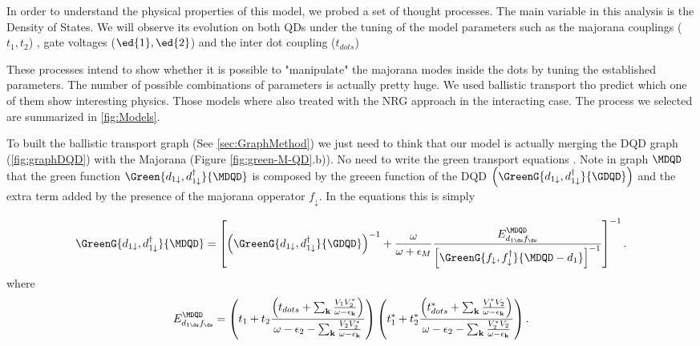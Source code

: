 In order to understand the physical properties of this model, we probed a set of thought processes. The main variable in this analysis is the Density of States.  We  will observe its evolution on both QDs under the tuning of the model parameters such as the majorana couplings ($t_1 , t_2$)  ,  gate voltages ($\ed{1} , \ed{2} $) and the inter dot coupling ($t_{dots}$)



These processes intend to show whether it is possible to "manipulate" the majorana modes inside the dots by tuning the established parameters. The number of possible combinations of parameters is actually pretty huge. We used ballistic transport tho predict which one of them show interesting physics. Those models where also treated with the NRG approach in the interacting case. The process we selected are summarized in \ref{fig:Models}. 

To built the ballistic transport graph (See \ref{sec:GraphMethod}) we just need to think that our model is actually merging the DQD graph (\ref{fig:graphDQD}) with the Majorana (Figure \ref{fig:green-M-QD}.b)). No need to write the green transport equations . Note  in graph $\MDQD$ that the  green function  $\Green{d_{1\downarrow},d_{1\downarrow}^{\dagger}}{\MDQD}$  is composed by the greeen function of the DQD $\left(\GreenG{d_{1\downarrow},d_{1\downarrow}^{\dagger}}{\GDQD } \right)$ and the extra term added by the presence of the majorana opperator $f_\downarrow$. In the equations this is simply 

\begin{equation}
    \GreenG{d_{1\downarrow},d_{1\downarrow}^{\dagger}}{\MDQD}=\left[\left(\GreenG{d_{1\downarrow},d_{1\downarrow}^{\dagger}}{\GDQD } \right)^{-1}+\frac{\omega}{\omega+\epsilon_{M}}\frac{E_{d_{1\dw}f_{\dw}}^{\MDQD}}{\left[\GreenG{f_{\downarrow},f_{\downarrow}^{\dagger}}{\MDQD-d_{1}}\right]^{-1}}\right]^{-1}.
\end{equation}
where 
\begin{equation}
    E_{d_{1\dw}f_{\dw}}^{\MDQD}=\left(t_{1}+t_{2}\frac{\left(t_{dots}+\sum_{\mathbf{k}}\frac{V_{1}V_{2}^{*}}{\omega-\epsilon_{\mathbf{k}}}\right)}{\omega-\epsilon_{2}-\sum_{\mathbf{k}}\frac{V_{2}V_{2}^{*}}{\omega-\epsilon_{\mathbf{k}}}}\right)\left(t_{1}^{*}+t_{2}^{*}\frac{\left(t_{dots}^{*}+\sum_{\mathbf{k}}\frac{V_{1}^{*}V_{2}}{\omega-\epsilon_{\mathbf{k}}}\right)}{\omega-\epsilon_{2}-\sum_{\mathbf{k}}\frac{V_{2}^{*}V_{2}}{\omega-\epsilon_{\mathbf{k}}}}\right).
\end{equation}

